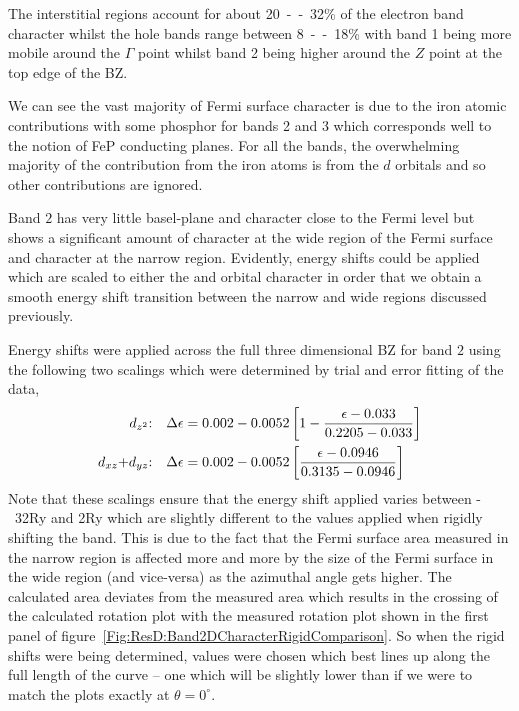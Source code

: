 The interstitial regions account for about \unit{20--32}{\%} of the electron band character whilst the hole bands range between \unit{8--18}{\%} with band 1 being more mobile around the $\Gamma$ point whilst band 2 being higher around the $Z$ point at the top edge of the \ac{BZ}.

We can see the vast majority of Fermi surface character is due to the iron atomic contributions with some phosphor for bands 2 and 3 which corresponds well to the notion of FeP conducting planes. For all the bands, the overwhelming majority of the contribution from the iron atoms is from the $d$ orbitals and so other contributions are ignored.

Band $2$ has very little basel-plane \Dxy{} and \DxTwoyTwo{} character close to the Fermi level but shows a significant amount of \DzTwo{} character at the wide region of the Fermi surface and \DxzDyz{} character at the narrow region. Evidently, energy shifts could be applied which are scaled to either the \DzTwo{} and \DxzDyz{} orbital character in order that we obtain a smooth energy shift transition between the narrow and wide regions discussed previously. 

Energy shifts were applied across the full three dimensional \ac{BZ} for band $2$ using the following two scalings which were determined by trial and error fitting of the data,
\begin{align*}
\textrm{\ensuremath{d_{z^2}}:}\quad \Delta\epsilon &= 0.002 - 0.0052 \left[1 - \frac{\epsilon - 0.033}{0.2205 - 0.033}\right] \\
\textrm{\ensuremath{d_{xz}}+\ensuremath{d_{yz}}:}\quad \Delta\epsilon &= 0.002 - 0.0052 \left[\frac{\epsilon - 0.0946}{0.3135 - 0.0946}\right]
\end{align*}
Note that these scalings ensure that the energy shift applied varies between \unit{-32}{\milli\textrm{Ry}} and \unit{2}{\milli\textrm{Ry}} which are slightly different to the values applied when rigidly shifting the band. This is due to the fact that the Fermi surface area measured in the narrow region is affected more and more by the size of the Fermi surface in the wide region (and vice-versa) as the azimuthal angle gets higher. The calculated area deviates from the measured area which results in the crossing of the calculated rotation plot with the measured rotation plot shown in the first panel of figure~\ref{Fig:ResD:Band2DCharacterRigidComparison}. So when the rigid shifts were being determined, values were chosen which best lines up along the full length of the curve -- one which will be slightly lower than if we were to match the plots exactly at $\theta=0^\circ$.


